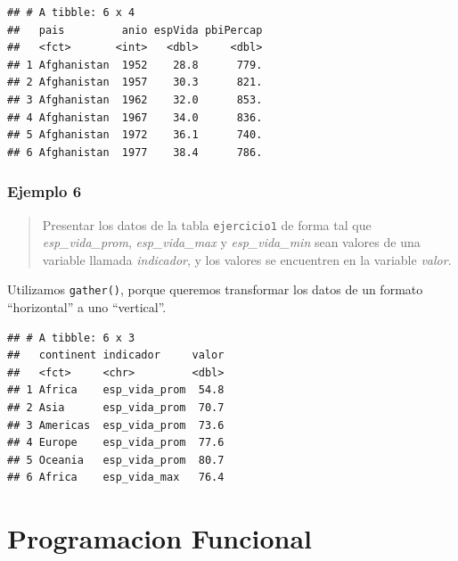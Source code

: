 \documentclass[]{book}
\newenvironment{Shaded}{\begin{snugshade}}{\end{snugshade}}
\newcommand{\DataTypeTok}[1]{\textcolor[rgb]{0.13,0.29,0.53}{#1}}
\newcommand{\DecValTok}[1]{\textcolor[rgb]{0.00,0.00,0.81}{#1}}
\newcommand{\KeywordTok}[1]{\textcolor[rgb]{0.13,0.29,0.53}{\textbf{#1}}}
\newcommand{\NormalTok}[1]{#1}
\newcommand{\OperatorTok}[1]{\textcolor[rgb]{0.81,0.36,0.00}{\textbf{#1}}}
\newcommand{\StringTok}[1]{\textcolor[rgb]{0.31,0.60,0.02}{#1}}
\begin{document}
\begin{verbatim}
## # A tibble: 6 x 4
##   pais         anio espVida pbiPercap
##   <fct>       <int>   <dbl>     <dbl>
## 1 Afghanistan  1952    28.8      779.
## 2 Afghanistan  1957    30.3      821.
## 3 Afghanistan  1962    32.0      853.
## 4 Afghanistan  1967    34.0      836.
## 5 Afghanistan  1972    36.1      740.
## 6 Afghanistan  1977    38.4      786.
\end{verbatim}

\hypertarget{ejemplo-6}{%
\subsection{Ejemplo 6}\label{ejemplo-6}}

\begin{quote}
Presentar los datos de la tabla \texttt{ejercicio1} de forma tal que \emph{esp\_vida\_prom}, \emph{esp\_vida\_max} y \emph{esp\_vida\_min} sean valores de una variable llamada \emph{indicador}, y los valores se encuentren en la variable \emph{valor}.
\end{quote}

Utilizamos \texttt{gather()}, porque queremos transformar los datos de un formato ``horizontal'' a uno ``vertical''.

\begin{Shaded}
\end{Shaded}

\begin{verbatim}
## # A tibble: 6 x 3
##   continent indicador     valor
##   <fct>     <chr>         <dbl>
## 1 Africa    esp_vida_prom  54.8
## 2 Asia      esp_vida_prom  70.7
## 3 Americas  esp_vida_prom  73.6
## 4 Europe    esp_vida_prom  77.6
## 5 Oceania   esp_vida_prom  80.7
## 6 Africa    esp_vida_max   76.4
\end{verbatim}

\hypertarget{programacion-funcional}{%
\chapter{Programacion Funcional}\label{programacion-funcional}}
\end{document}
